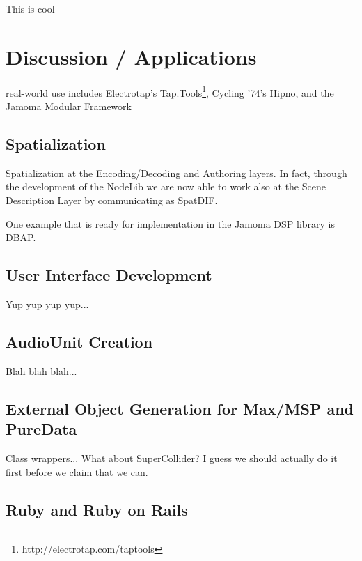 \documentclass[twoside,10pt]{article}
\begin{document}
This is cool





\section{Discussion / Applications} %

real-world use includes Electrotap's Tap.Tools\footnote{http://electrotap.com/taptools}, Cycling '74's Hipno\cite{Place:2005}, and the Jamoma Modular Framework\cite{Place:2006}


\subsection{Spatialization}

Spatialization at the Encoding/Decoding and Authoring layers\cite{Peters:2009}.  In fact, through the development of the NodeLib we are now able to work also at the Scene Description Layer by communicating as SpatDIF\cite{Peters:2008spatdif}.

One example that is ready for implementation in the Jamoma DSP library is DBAP\cite{Lossius:2009}.


\subsection{User Interface Development}

Yup yup yup yup...

\subsection{AudioUnit Creation}

Blah blah blah...

\subsection{External Object Generation for Max/MSP and PureData}

Class wrappers...  What about SuperCollider?  I guess we should actually do it first before we claim that we can.

\subsection{Ruby and Ruby on Rails}
\end{document}

